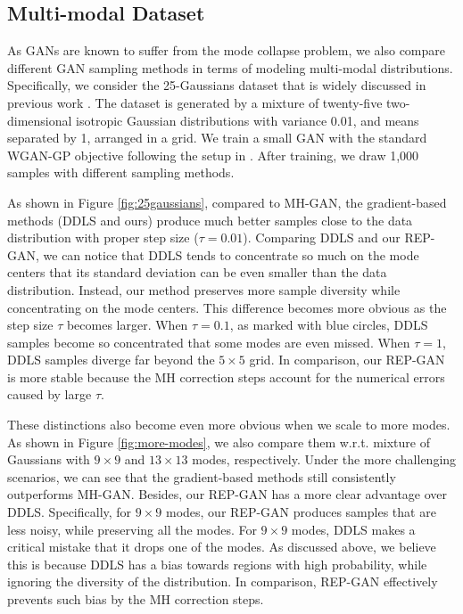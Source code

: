 \documentclass[runningheads]{llncs}
\newcommand{\<}{\left\langle}
\renewcommand{\>}{\right\rangle}
\begin{document}
\subsection{Multi-modal Dataset}

As GANs are known to suffer from the mode collapse problem, we also compare different GAN sampling methods in terms of modeling multi-modal distributions. Specifically, we consider the 25-Gaussians dataset that is widely discussed in previous work \cite{azadi2019discriminator,turner2019metropolis,che2020your}. The dataset is generated by a mixture of twenty-five two-dimensional isotropic Gaussian distributions with variance 0.01, and means separated by 1, arranged in a grid. We train a small GAN with the standard WGAN-GP objective following the setup in  \cite{tanaka2019discriminator}. After training, we draw 1,000 samples with different sampling methods. 

As shown in Figure \ref{fig:25gaussians}, compared to MH-GAN, the gradient-based methods (DDLS and ours) produce much better samples close to the data distribution with proper step size ($\tau=0.01$). Comparing DDLS and our REP-GAN, we can notice that DDLS tends to concentrate so much on the mode centers that its standard deviation can be even smaller than the data distribution. Instead, our method preserves more sample diversity while concentrating on the mode centers. This difference becomes more obvious as the step size $\tau$ becomes larger. When $\tau=0.1$, as marked with blue circles, DDLS samples become so concentrated that some modes are even missed. When $\tau=1$, DDLS samples diverge far beyond the $5\times5$ grid. 
In comparison, our REP-GAN is more stable because the MH correction steps account for the numerical errors caused by large $\tau$.

These distinctions also become even more obvious when we scale to more modes. As shown in Figure \ref{fig:more-modes}, we also compare them w.r.t. mixture of Gaussians with $9\times9$ and $13\times13$ modes, respectively. Under the more challenging scenarios, we can see that the gradient-based methods still consistently outperforms MH-GAN. Besides, our REP-GAN has a more clear advantage over DDLS. Specifically, for $9\times9$ modes, our REP-GAN produces samples that are less noisy, while preserving all the modes. For $9\times9$ modes, DDLS makes a critical mistake that it drops one of the modes. As discussed above, we believe this is because DDLS has a bias towards regions with high probability, while ignoring the diversity of the distribution. In comparison, REP-GAN effectively prevents such bias by the MH correction steps.
\end{document}
